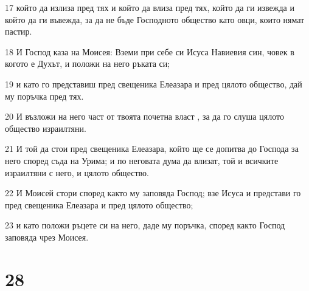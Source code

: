 \par 17 който да излиза пред тях и който да влиза пред тях, който да ги извежда и който да ги въвежда, за да не бъде Господното общество като овци, които нямат пастир.
\par 18 И Господ каза на Моисея: Вземи при себе си Исуса Навиевия син, човек в когото е Духът, и положи на него ръката си;
\par 19 и като го представиш пред свещеника Елеазара и пред цялото общество, дай му поръчка пред тях.
\par 20 И възложи на него част от твоята почетна власт , за да го слуша цялото общество израилтяни.
\par 21 И той да стои пред свещеника Елеазара, който ще се допитва до Господа за него според съда на Урима; и по неговата дума да влизат, той и всичките израилтяни с него, и цялото общество.
\par 22 И Моисей стори според както му заповяда Господ; взе Исуса и представи го пред свещеника Елеазара и пред цялото общество;
\par 23 и като положи ръцете си на него, даде му поръчка, според както Господ заповяда чрез Моисея.

\chapter{28}

